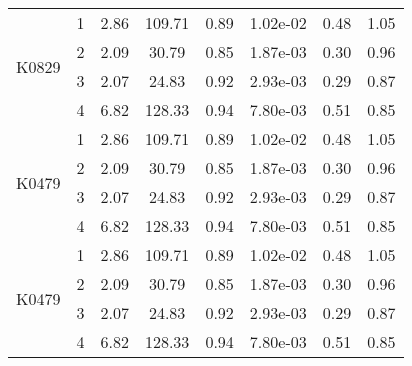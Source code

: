\documentclass[11pt,a4paper]{article}
\begin{document}
\begin{longtable}{|c|c|c|c|c|c|c|c|}
\multirow{4}{*}{K0829} & 1 & 2.86 & 109.71 & 0.89 & 1.02e-02 & 0.48 & 1.05 \\
& 2 & 2.09 & 30.79 & 0.85 & 1.87e-03 & 0.30 & 0.96 \\
& 3 & 2.07 & 24.83 & 0.92 & 2.93e-03 & 0.29 & 0.87 \\
& 4 & 6.82 & 128.33 & 0.94& 7.80e-03 & 0.51 & 0.85 \\ \hline

\multirow{4}{*}{K0479} & 1 & 2.86 & 109.71 & 0.89 & 1.02e-02 & 0.48 & 1.05 \\
& 2 & 2.09 & 30.79 & 0.85 & 1.87e-03 & 0.30 & 0.96 \\
& 3 & 2.07 & 24.83 & 0.92 & 2.93e-03 & 0.29 & 0.87 \\
& 4 & 6.82 & 128.33 & 0.94& 7.80e-03 & 0.51 & 0.85 \\ \hline


\multirow{4}{*}{K0479} & 1 & 2.86 & 109.71 & 0.89 & 1.02e-02 & 0.48 & 1.05 \\
& 2 & 2.09 & 30.79 & 0.85 & 1.87e-03 & 0.30 & 0.96 \\
& 3 & 2.07 & 24.83 & 0.92 & 2.93e-03 & 0.29 & 0.87 \\
& 4 & 6.82 & 128.33 & 0.94& 7.80e-03 & 0.51 & 0.85 \\ \hline
\hline

\end{longtable}
\end{document}
